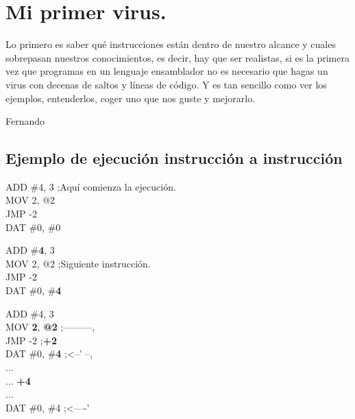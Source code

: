 \newpage
\section{Mi primer virus.}
\noindent
Lo primero es saber qué instrucciones están dentro de nuestro alcance y cuales sobrepasan nuestros conocimientos, es decir, hay que ser realistas, si es la primera vez que programas en un lenguaje ensamblador no es necesario que hagas un virus con decenas de saltos y líneas de código.
\newline Y es tan sencillo como ver los ejemplos, entenderlos, coger uno que nos guste y mejorarlo. 
\begin{flushright} Fernando \end{flushright}

\subsection{Ejemplo de ejecución instrucción a instrucción}
\begin{tcolorbox}
    ADD \#4, 3 \phantom{................};Aquí comienza la ejecución. \\
    MOV 2, @2\\
    JMP -2\\
    DAT \#0, \#0
\end{tcolorbox}

\begin{tcolorbox}
    ADD \#\textbf{4}, 3\\
    MOV 2, @2 \phantom{................};Siguiente instrucción. \\
    JMP -2\\
    DAT \#0, \#\textbf{4}
\end{tcolorbox}

\begin{tcolorbox}
    ADD \#4, 3\\
    MOV \textbf{2}, \textbf{@2} ;\phantom{...}---------,\\
    JMP -2\phantom{........} ;\phantom{.............}\| \textbf{+2}\\
    DAT \#0, \#\textbf{4} ;\phantom{..}<--' --,\\ %
    ...\phantom{.......................................} \|\\
    ...\phantom{.......................................} \| \textbf{+4}\\
    ...\phantom{.......................................} \|\\
    DAT \#0, \#4 ;\phantom{...}<----' %
\end{tcolorbox}

